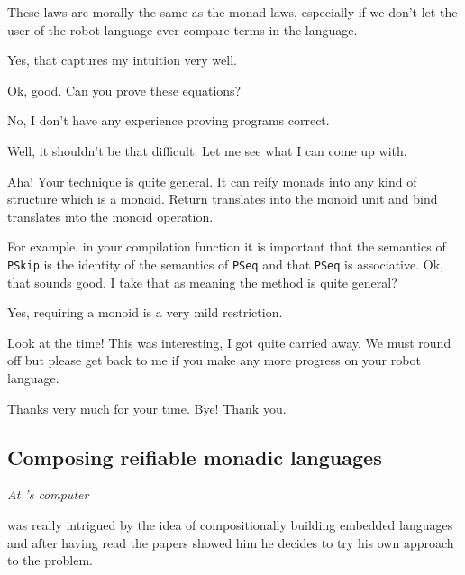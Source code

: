 \begin{dialogue}
\speak{\docname{}} These laws are morally the same as the monad
laws, especially if we don't let the user of the robot language ever
compare terms in the language.

\speak{\studname{}} Yes, that captures my intuition very well.

\speak{\docname{}} Ok, good. Can you prove these equations?

\speak{\studname{}} No, I don't have any experience proving programs correct.

\speak{\docname{}} Well, it shouldn't be that difficult. Let me see
what I can come up with.


Aha! Your technique is quite general. It can reify
monads into any kind of structure which is a monoid. Return translates
into the monoid unit and bind translates into the monoid operation.

For example, in your compilation function it is important that the semantics of
\texttt{PSkip} is the identity of the semantics of \texttt{PSeq} and that
\texttt{PSeq}
is associative.
\speak{\studname{}} Ok, that sounds good. I take that as meaning the method
is quite general? 

\speak{\docname{}} Yes, requiring a monoid is a very mild restriction. 

Look at the time! This was interesting, I got quite carried away. We must 
round off but please get back to me if you make any more progress on your 
robot language.

\speak{\studname{}} Thanks very much for your time. Bye!
\speak{\docname{}} Thank you. 

\end{dialogue}

\subsection{Composing reifiable monadic languages} 
\label{sec:composing} 

\emph{At \studname{}'s computer} \newline

\studname{} was really intrigued by the idea of compositionally
building embedded languages and after having read the papers
\docname{} showed him he decides to try his own approach to the problem.

